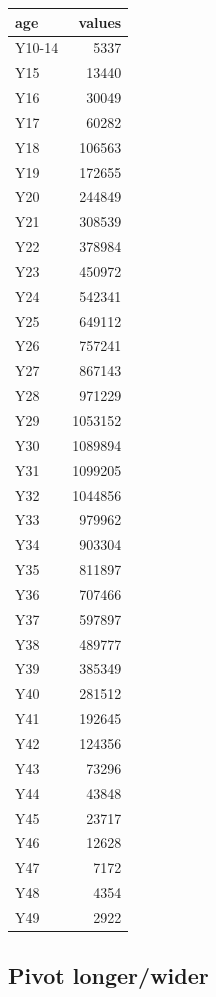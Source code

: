 \documentclass[
]{article}
\begin{document}
\begin{tabular}{l|r}
\hline
age & values\\
\hline
Y10-14 & 5337\\
\hline
Y15 & 13440\\
\hline
Y16 & 30049\\
\hline
Y17 & 60282\\
\hline
Y18 & 106563\\
\hline
Y19 & 172655\\
\hline
Y20 & 244849\\
\hline
Y21 & 308539\\
\hline
Y22 & 378984\\
\hline
Y23 & 450972\\
\hline
Y24 & 542341\\
\hline
Y25 & 649112\\
\hline
Y26 & 757241\\
\hline
Y27 & 867143\\
\hline
Y28 & 971229\\
\hline
Y29 & 1053152\\
\hline
Y30 & 1089894\\
\hline
Y31 & 1099205\\
\hline
Y32 & 1044856\\
\hline
Y33 & 979962\\
\hline
Y34 & 903304\\
\hline
Y35 & 811897\\
\hline
Y36 & 707466\\
\hline
Y37 & 597897\\
\hline
Y38 & 489777\\
\hline
Y39 & 385349\\
\hline
Y40 & 281512\\
\hline
Y41 & 192645\\
\hline
Y42 & 124356\\
\hline
Y43 & 73296\\
\hline
Y44 & 43848\\
\hline
Y45 & 23717\\
\hline
Y46 & 12628\\
\hline
Y47 & 7172\\
\hline
Y48 & 4354\\
\hline
Y49 & 2922\\
\hline
\end{tabular}

\hypertarget{pivot-longerwider}{%
\subsection{Pivot longer/wider}\label{pivot-longerwider}}
\end{document}
